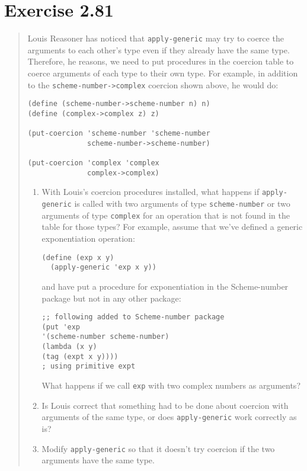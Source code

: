 \documentclass{article}
\begin{document}


\section{Exercise 2.81}
\begin{quote}
    Louis Reasoner has noticed that \texttt{apply-generic} may try to coerce
    the arguments to each other's type even if they already have the same type.
    Therefore, he reasons, we need to put procedures in the coercion table to
    coerce arguments of each type to their own type. For example, in addition
    to the \texttt{scheme-number->complex} coercion shown above, he would do:

    \begin{lstlisting}
(define (scheme-number->scheme-number n) n)
(define (complex->complex z) z)

(put-coercion 'scheme-number 'scheme-number
              scheme-number->scheme-number)

(put-coercion 'complex 'complex
              complex->complex)
    \end{lstlisting}

    \begin{enumerate}
        \item With Louis's coercion procedures installed, what happens if
            \texttt{apply-generic} is called with two arguments of type
            \texttt{scheme-number} or two arguments of type \texttt{complex}
            for an operation that is not found in the table for those types?
            For example, assume that we've defined a generic exponentiation
            operation:

            \begin{lstlisting}
(define (exp x y)
  (apply-generic 'exp x y))
            \end{lstlisting}

            and have put a procedure for exponentiation in the Scheme-number
            package but not in any other package:

            \begin{lstlisting}
;; following added to Scheme-number package
(put 'exp
'(scheme-number scheme-number)
(lambda (x y)
(tag (expt x y))))
; using primitive expt
            \end{lstlisting}

            What happens if we call \texttt{exp} with two complex numbers as
            arguments?
        \item Is Louis correct that something had to be done about coercion
            with arguments of the same type, or does \texttt{apply-generic} work
            correctly as is?
        \item Modify \texttt{apply-generic} so that it doesn’t try coercion if
            the two arguments have the same type.
    \end{enumerate}
\end{quote}
\end{document}
